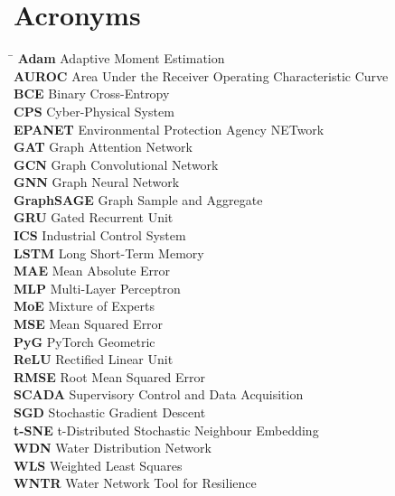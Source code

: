 \chapter*{Acronyms}

\begin{tabbing}
  \hspace{3cm} \= \kill
  \textbf{Adam}      \> Adaptive Moment Estimation \\[0.3em]
  \textbf{AUROC}     \> Area Under the Receiver Operating Characteristic Curve \\[0.3em]
  \textbf{BCE}       \> Binary Cross-Entropy \\[0.3em]
  \textbf{CPS}       \> Cyber-Physical System \\[0.3em]
  \textbf{EPANET}    \> Environmental Protection Agency NETwork \\[0.3em]
  \textbf{GAT}       \> Graph Attention Network \\[0.3em]
  \textbf{GCN}       \> Graph Convolutional Network \\[0.3em]
  \textbf{GNN}       \> Graph Neural Network \\[0.3em]
  \textbf{GraphSAGE} \> Graph Sample and Aggregate \\[0.3em]
  \textbf{GRU}       \> Gated Recurrent Unit \\[0.3em]
  \textbf{ICS}       \> Industrial Control System \\[0.3em]
  \textbf{LSTM}      \> Long Short-Term Memory \\[0.3em]
  \textbf{MAE}       \> Mean Absolute Error \\[0.3em]
  \textbf{MLP}       \> Multi-Layer Perceptron \\[0.3em]
  \textbf{MoE}       \> Mixture of Experts \\[0.3em]
  \textbf{MSE}       \> Mean Squared Error \\[0.3em]
  \textbf{PyG}       \> PyTorch Geometric \\[0.3em]
  \textbf{ReLU}      \> Rectified Linear Unit \\[0.3em]
  \textbf{RMSE}      \> Root Mean Squared Error \\[0.3em]
  \textbf{SCADA}     \> Supervisory Control and Data Acquisition \\[0.3em]
  \textbf{SGD}       \> Stochastic Gradient Descent \\[0.3em]
  \textbf{t-SNE}     \> t-Distributed Stochastic Neighbour Embedding \\[0.3em]
  \textbf{WDN}       \> Water Distribution Network \\[0.3em]
  \textbf{WLS}       \> Weighted Least Squares \\[0.3em]
  \textbf{WNTR}      \> Water Network Tool for Resilience \\[0.3em]
\end{tabbing}
